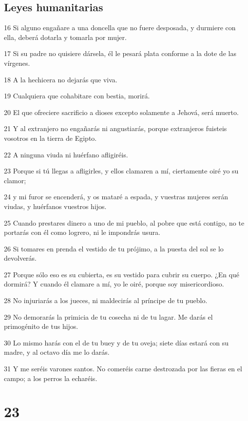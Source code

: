 \section*{Leyes humanitarias}

\par 16 Si alguno engañare a una doncella que no fuere desposada, y durmiere con ella, deberá dotarla y tomarla por mujer.
\par 17 Si su padre no quisiere dársela, él le pesará plata conforme a la dote de las vírgenes.
\par 18 A la hechicera no dejarás que viva.
\par 19 Cualquiera que cohabitare con bestia, morirá.
\par 20 El que ofreciere sacrificio a dioses excepto solamente a Jehová, será muerto.
\par 21 Y al extranjero no engañarás ni angustiarás, porque extranjeros fuisteis vosotros en la tierra de Egipto.
\par 22 A ninguna viuda ni huérfano afligiréis.
\par 23 Porque si tú llegas a afligirles, y ellos clamaren a mí, ciertamente oiré yo su clamor;
\par 24 y mi furor se encenderá, y os mataré a espada, y vuestras mujeres serán viudas, y huérfanos vuestros hijos.
\par 25 Cuando prestares dinero a uno de mi pueblo, al pobre que está contigo, no te portarás con él como logrero, ni le impondrás usura.
\par 26 Si tomares en prenda el vestido de tu prójimo, a la puesta del sol se lo devolverás.
\par 27 Porque sólo eso es su cubierta, es su vestido para cubrir su cuerpo. ¿En qué dormirá? Y cuando él clamare a mí, yo le oiré, porque soy misericordioso.
\par 28 No injuriarás a los jueces, ni maldecirás al príncipe de tu pueblo.
\par 29 No demorarás la primicia de tu cosecha ni de tu lagar. Me darás el primogénito de tus hijos.
\par 30 Lo mismo harás con el de tu buey y de tu oveja; siete días estará con su madre, y al octavo día me lo darás.
\par 31 Y me seréis varones santos. No comeréis carne destrozada por las fieras en el campo; a los perros la echaréis.

\chapter{23}


